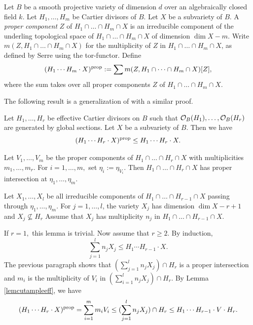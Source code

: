 Let $B$ be a smooth projective variety of dimension $d$ over an algebraically closed field $k$.
Let $H_1,\dots,H_m$ be Cartier divisors of $B$. Let $X$ be a subvariety of $B.$
A \emph{proper component} $Z$ of $H_1\cap \dots \cap H_m\cap X$ is an irreducible component of the underling topological space of $H_1\cap \dots \cap H_m\cap X$ of dimension $\dim X-m.$ Write $m(Z, H_1\cap \dots \cap H_m\cap X)$ for the multiplicity of $Z$ in $H_1\cap \dots \cap H_m\cap X$, as defined by Serre using the tor-functor.
Define
$$(H_1\cdots H_m\cdot X)^{{\rm prop}}:=\sum m(Z, H_1\cap \dots \cap H_m\cap X) [Z],$$
where the  sum takes over all proper components $Z$ of $H_1\cap \dots \cap H_m\cap X$.









The following result is a generalization of \cite[Lemma 3.3]{Jia2021} with a similar proof.

\begin{pro}\label{propropintboundhyp}
Let $H_1, \dots, H_r$ be effective Cartier divisors on $B$ such that
${\mathcal O}_B(H_1),\dots,{\mathcal O}_B(H_r)$ are generated by global sections.
Let $X$ be a subvariety of $B$.
Then we have
$$(H_1\cdots H_r\cdot X)^{{\rm prop}}\leq H_1\cdots H_r\cdot X.$$
\end{pro}

\proof
Let $V_1,\dots, V_m$ be the proper components of $H_1\cap \dots \cap H_r\cap X$ with multiplicities $m_1,\dots,m_r.$
For $i=1,\dots,m,$ set $\eta_i:=\eta_{V_i}$. Then $H_1\cap \dots \cap H_r\cap X$ has proper intersection at $\eta_1,\dots, \eta_m.$

Let $X_1,\dots, X_l$ be all irreducible components of $H_1\cap\dots\cap H_{r-1}\cap X$ passing through $\eta_1,\dots, \eta_m.$
For  $j=1,\dots,l$, the variety $X_j$ has dimension $\dim X-r+1$ and $X_j\not\subseteq H_r$
Assume that $X_j$ has multiplicity $n_j$ in $H_1\cap\dots\cap H_{r-1}\cap X$.

If $r=1,$ this lemma is trivial.  Now assume that $r\geq 2$.
By induction,
 $$\sum_{j=1}^l n_jX_j\leq H_1\cdots H_{r-1}\cdot X.$$
The previous paragraph shows that $(\sum_{j=1}^l n_jX_j)\cap H_r$ is a proper intersection and $m_i$ is the multiplicity of $V_i$ in $(\sum_{i=1}^l n_jX_j)\cap H_r.$
By Lemma \ref{lemcutampleeff}, we have
$$(H_1\cdots H_r\cdot X)^{{\rm prop}}=\sum_{i=1}^m m_iV_i\leq (\sum_{j=1}^l n_jX_j)\cap H_r\leq H_1\cdots H_{r-1}\cdot V\cdot H_r.$$
\endproof


